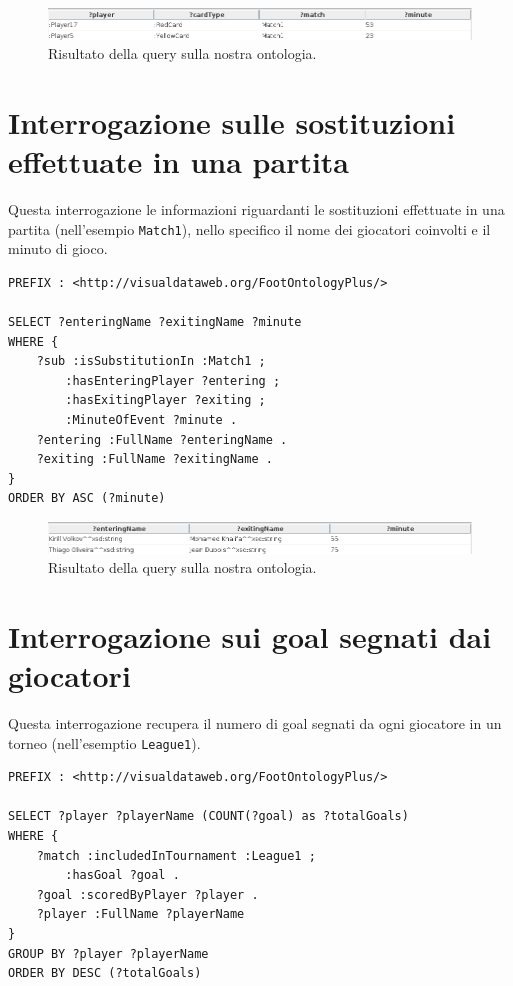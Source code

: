 \documentclass[11pt]{report} %
\begin{document}
\begin{itemize}[leftmargin=*]
\begin{figure}[H]
	\includegraphics[width=\textwidth]{query3}
	\caption{Risultato della query sulla nostra ontologia.}
\end{figure}

\section{Interrogazione sulle sostituzioni effettuate in una partita}

Questa interrogazione le informazioni riguardanti le sostituzioni effettuate in una partita (nell'esempio \texttt{Match1}), nello specifico il nome dei giocatori coinvolti e il minuto di gioco. 

\begin{lstlisting}
PREFIX : <http://visualdataweb.org/FootOntologyPlus/>

SELECT ?enteringName ?exitingName ?minute
WHERE {
    ?sub :isSubstitutionIn :Match1 ;
        :hasEnteringPlayer ?entering ;
        :hasExitingPlayer ?exiting ;
        :MinuteOfEvent ?minute .
    ?entering :FullName ?enteringName .
    ?exiting :FullName ?exitingName .
}
ORDER BY ASC (?minute)
\end{lstlisting}

\begin{figure}[H]
	\includegraphics[width=\textwidth]{query4}
	\caption{Risultato della query sulla nostra ontologia.}
\end{figure}

\section{Interrogazione sui goal segnati dai giocatori}

Questa interrogazione recupera il numero di goal segnati da ogni giocatore in un torneo (nell'esemptio \texttt{League1}).

\begin{lstlisting}
PREFIX : <http://visualdataweb.org/FootOntologyPlus/>

SELECT ?player ?playerName (COUNT(?goal) as ?totalGoals) 
WHERE {
    ?match :includedInTournament :League1 ;
        :hasGoal ?goal .
    ?goal :scoredByPlayer ?player .
    ?player :FullName ?playerName
}
GROUP BY ?player ?playerName
ORDER BY DESC (?totalGoals)
\end{lstlisting}


\end{itemize}
\end{document}
